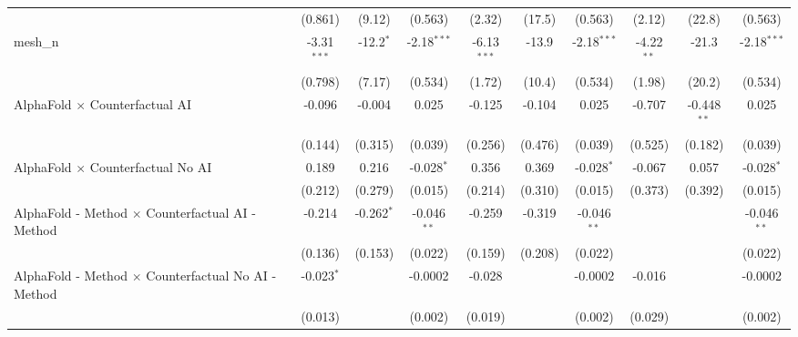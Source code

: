 \begin{tabular}{lccccccccc}
                                                               & (0.861)       & (9.12)        & (0.563)       & (2.32)        & (17.5)         & (0.563)       & (2.12)        & (22.8)        & (0.563)\\   
   mesh\_n                                                     & -3.31$^{***}$ & -12.2$^{*}$   & -2.18$^{***}$ & -6.13$^{***}$ & -13.9          & -2.18$^{***}$ & -4.22$^{**}$  & -21.3         & -2.18$^{***}$\\   
                                                               & (0.798)       & (7.17)        & (0.534)       & (1.72)        & (10.4)         & (0.534)       & (1.98)        & (20.2)        & (0.534)\\   
   AlphaFold $\times$ Counterfactual AI                        & -0.096        & -0.004        & 0.025         & -0.125        & -0.104         & 0.025         & -0.707        & -0.448$^{**}$ & 0.025\\   
                                                               & (0.144)       & (0.315)       & (0.039)       & (0.256)       & (0.476)        & (0.039)       & (0.525)       & (0.182)       & (0.039)\\   
   AlphaFold $\times$ Counterfactual No AI                     & 0.189         & 0.216         & -0.028$^{*}$  & 0.356         & 0.369          & -0.028$^{*}$  & -0.067        & 0.057         & -0.028$^{*}$\\   
                                                               & (0.212)       & (0.279)       & (0.015)       & (0.214)       & (0.310)        & (0.015)       & (0.373)       & (0.392)       & (0.015)\\   
   AlphaFold - Method $\times$ Counterfactual AI - Method      & -0.214        & -0.262$^{*}$  & -0.046$^{**}$ & -0.259        & -0.319         & -0.046$^{**}$ &               &               & -0.046$^{**}$\\   
                                                               & (0.136)       & (0.153)       & (0.022)       & (0.159)       & (0.208)        & (0.022)       &               &               & (0.022)\\   
   AlphaFold - Method $\times$ Counterfactual No AI - Method   & -0.023$^{*}$  &               & -0.0002       & -0.028        &                & -0.0002       & -0.016        &               & -0.0002\\   
                                                               & (0.013)       &               & (0.002)       & (0.019)       &                & (0.002)       & (0.029)       &               & (0.002)\\   

\end{tabular}
